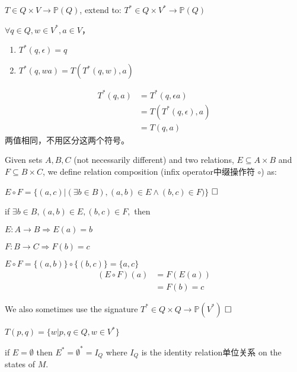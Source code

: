 \begin{note}
	$T\in Q\times V\to \mathbb{P}(Q)$,	extend to: $T^\ast \in Q\times V^\ast \to \mathbb{P}(Q)$
	
	$\forall q\in Q, w\in V^{\ast}, a\in V$，
	\begin{enumerate}
		\item $T^\ast(q,\epsilon) = q$
		\item $T^\ast(q,wa) = T(T^\ast(q,w),a)$
	\end{enumerate}
	\begin{align*}
	T^\ast(q,a) &= T^\ast(q,\epsilon a) \\
	&= T(T^\ast(q,\epsilon),a) \\
	&= T(q,a)
	\end{align*}
	两值相同，不用区分这两个符号。 
\end{note}

\begin{convention}\label{con:comp} Given sets $A,B,C$ (not necessarily different) and two relations, $E\subseteq A\times B$ and $F\subseteq B\times C$, we define relation composition (infix operator中缀操作符 $\circ$) as:

$E\circ F = \{(a,c)|(\exists b\in B),(a,b)\in E\land (b,c)\in F)\}$  $\hfill\square$
\end{convention}

\begin{note} if $\exists b\in B,(a,b)\in E,(b,c)\in F,$ then
	
	$E:A\to B\Rightarrow E(a)=b$
	
	$F:B\to C\Rightarrow F(b)=c$
	
	$E\circ F =\{(a,b)\}\circ \{(b,c)\}=\{a,c\}$
	\begin{align*}
	(E\circ F)(a) &=F(E(a)) \\
	&=F(b) = c
	\end{align*}
\end{note}

\begin{remark}
	We also sometimes use the signature $T^\ast\in Q\times Q\to \mathbb{P}(V^\ast)$ $\hfill\square$
\end{remark}

\begin{note}
	$T(p,q)=\{w|p,q\in Q,w\in V^\ast\}$
\end{note}

\begin{remark}
	if $E=\emptyset$ then $E^\ast=\emptyset^\ast=I_Q$ where $I_Q$ is the identity relation单位关系 on the states of $M$.
\end{remark}

